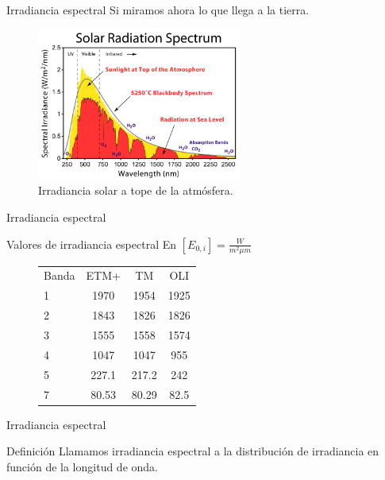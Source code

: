 \documentclass[handout]{beamer}
\begin{document}
\begin{frame}{Irradiancia espectral}
  Si miramos ahora lo que llega a la tierra.
  \begin{figure}
    \includegraphics[width=0.6\textwidth]{imagenes/solar_spectrum.png}
    \caption{Irradiancia solar a tope de la atmósfera.}
  \end{figure}
\end{frame}

\begin{frame}{Irradiancia espectral}
  \begin{exampleblock}{Valores de irradiancia espectral}
    En $[E_{0,i}] = \frac{W}{m^2 \mu m}$
    \begin{figure}
      \begin{tabular}{l c c c}
          Banda & ETM+  & TM    &  OLI \\
          1     & 1970  & 1954  & 1925 \\
          2     & 1843  & 1826  & 1826 \\
          3     & 1555  & 1558  & 1574 \\
          4     & 1047  & 1047  & 955  \\
          5     & 227.1 & 217.2 & 242 \\
          7     & 80.53 & 80.29 & 82.5\\
      \end{tabular}
    \end{figure}
  \end{exampleblock}
\end{frame}

\begin{frame}{Irradiancia espectral}
  \begin{block}{Definición}
    Llamamos irradiancia espectral a la distribución de irradiancia en función de la longitud de onda.
  \end{block}
\end{frame}
\end{document}
